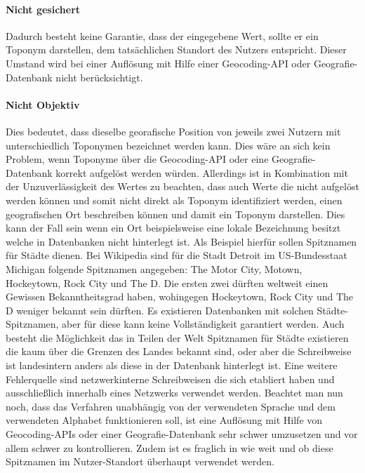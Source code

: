 			\paragraph{Nicht gesichert} Dadurch besteht keine Garantie, dass der eingegebene Wert, sollte er ein Toponym darstellen, dem tatsächlichen Standort des Nutzers entspricht. 
			Dieser Umstand wird bei einer Auflösung mit Hilfe einer Geocoding-API oder Geografie-Datenbank nicht berücksichtigt.

			\paragraph{Nicht Objektiv} 
			Dies bedeutet, dass dieselbe georafische Position von jeweils zwei Nutzern mit unterschiedlich Toponymen bezeichnet werden kann.
			Dies wäre an sich kein Problem, wenn Toponyme über die Geocoding-API oder eine Geografie-Datenbank korrekt aufgelöst werden würden. 
			Allerdings ist in Kombination mit der Unzuverlässigkeit des Wertes zu beachten, dass auch Werte die nicht aufgelöst werden können und somit nicht direkt als Toponym identifiziert werden, einen geografischen Ort beschreiben können und damit ein Toponym darstellen. 
			Dies kann der Fall sein wenn ein Ort beispielsweise eine lokale Bezeichnung besitzt welche in Datenbanken nicht hinterlegt ist. 
			Als Beispiel hierfür sollen Spitznamen für Städte dienen.  			
			Bei Wikipedia sind für die Stadt Detroit im US-Bundesstaat Michigan folgende Spitznamen angegeben: The Motor City, Motown, Hockeytown, Rock City und The D. 
			Die ersten zwei dürften weltweit einen Gewissen Bekanntheitsgrad haben, wohingegen Hockeytown, Rock City und The D weniger bekannt sein dürften.  
			Es existieren Datenbanken mit solchen Städte-Spitznamen, aber für diese kann keine Vollständigkeit garantiert werden. 
			Auch besteht die Möglichkeit das in Teilen der Welt Spitznamen für Städte existieren die kaum über die Grenzen des Landes bekannt sind, oder aber die Schreibweise ist landesintern anders als diese in der Datenbank hinterlegt ist. 
			Eine weitere Fehlerquelle sind netzwerkinterne Schreibweisen die sich etabliert haben und ausschließlich innerhalb eines Netzwerks verwendet werden.
			Beachtet man nun noch, dass das Verfahren unabhängig von der verwendeten Sprache und dem verwendeten Alphabet funktionieren soll, ist eine Auflösung mit Hilfe von Geocoding-APIs oder einer Geografie-Datenbank sehr schwer umzusetzen und vor allem schwer zu kontrollieren. 
			Zudem ist es fraglich in wie weit und ob diese Spitznamen im Nutzer-Standort überhaupt verwendet werden.  
